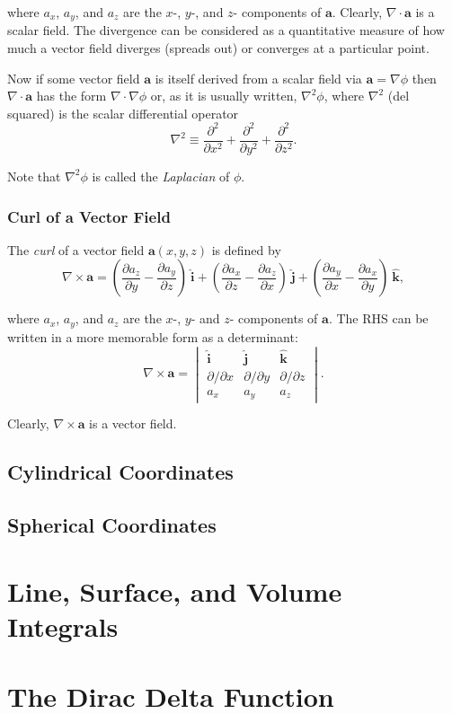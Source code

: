 \documentclass{article}
\newcommand{\ihat}{\mathbf{\hat{i}}}
\newcommand{\jhat}{\mathbf{\hat{j}}}
\newcommand{\khat}{\mathbf{\hat{k}}}
\begin{document}
where $a_x$, $a_y$, and $a_z$ are the $x$-, $y$-, and $z$- components of $\bm{a}$. Clearly, $\nabla \cdot \bm{a}$ is a scalar field. The divergence can be considered as a quantitative measure of how much a vector field diverges (spreads out) or converges at a particular point.

Now if some vector field $\bm{a}$ is itself derived from a scalar field via $\bm{a} = \nabla \phi$ then $\nabla \cdot \bm{a}$ has the form $\nabla \cdot \nabla \phi$ or, as it is usually written, $\nabla^2 \phi$, where $\nabla^2$ (del squared) is the scalar differential operator
\begin{equation*}
    \nabla^2 \equiv \frac{\partial^2}{\partial x^2} + \frac{\partial^2}{\partial y^2} + \frac{\partial^2}{\partial z^2}.
\end{equation*}

Note that $\nabla^2 \phi$ is called the \emph{Laplacian} of $\phi$.


\subsubsection{Curl of a Vector Field}

The \emph{curl} of a vector field $\bm{a}(x, y, z)$ is defined by
\begin{equation*}
    \nabla \times \bm{a} = \left( \frac{\partial a_z}{\partial y} - \frac{\partial a_y}{\partial z} \right)\ \ihat + \left( \frac{\partial a_x}{\partial z} - \frac{\partial a_z}{\partial x} \right)\ \jhat + \left( \frac{\partial a_y}{\partial x} - \frac{\partial a_x}{\partial y} \right)\ \khat,
\end{equation*}

where $a_x$, $a_y$, and $a_z$ are the $x$-, $y$- and $z$- components of $\bm{a}$. The RHS can be written in a more memorable form as a determinant:
\begin{equation*}
    \nabla \times \bm{a} = \begin{vmatrix} \ihat & \jhat & \khat \\ \partial/\partial x & \partial/\partial y & \partial/\partial z \\ a_x & a_y & a_z \end{vmatrix}.
\end{equation*}

Clearly, $\nabla \times \bm{a}$ is a vector field.

\subsection{Cylindrical Coordinates}

\subsection{Spherical Coordinates}

\section{Line, Surface, and Volume Integrals}

\section{The Dirac Delta Function}

\section{}
\end{document}
